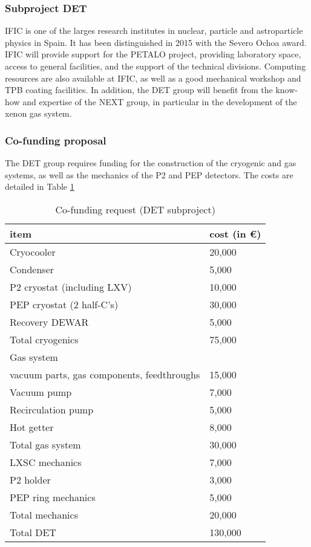\subsubsection*{Subproject DET}

IFIC is one of the larges research institutes in nuclear, particle and astroparticle physics in Spain. It has been distinguished in 2015 with the Severo Ochoa award. IFIC will provide support for the PETALO project, providing laboratory space, access to general facilities, and the support of the technical divisions. Computing resources are also available at IFIC, as well as a good mechanical workshop and TPB coating facilities. In addition, the DET group will benefit from the know-how and expertise of the NEXT group, in particular in the development of the xenon gas system.  

\subsubsection*{Co-funding proposal}
The DET group requires funding for the construction of the cryogenic and gas systems, as well as the mechanics of the P2 and PEP detectors. The costs are detailed in Table \ref{tab.costs.det}

\begin{table}[htp!]
\caption{Co-funding request (DET subproject)}
\begin{center}
\begin{tabular}{|l|l|}
\hline
item & cost (in \euro) \\
\hline
Cryocooler &	20,000 \\
Condenser &	5,000 \\
P2 cryostat (including LXV)  & 10,000 \\
PEP cryostat  (2 half-C's) & 30,000 \\
Recovery DEWAR &	5,000 \\
\hline
Total cryogenics &	75,000 \\
\hline
Gas system & \\
\hline	
vacuum parts, gas components, feedthroughs &	15,000 \\
Vacuum pump &  	7,000 \\
Recirculation pump & 5,000 \\
Hot getter & 8,000 \\
\hline
Total gas system &	30,000 \\
\hline
LXSC mechanics & 7,000 \\
P2 holder & 3,000 \\
PEP ring mechanics & 5,000 \\
\hline
Total mechanics &	20,000 \\
\hline
Total DET &	130,000 \\
\hline
\end{tabular}
\end{center}
\label{tab.costs.det}
\end{table}%
